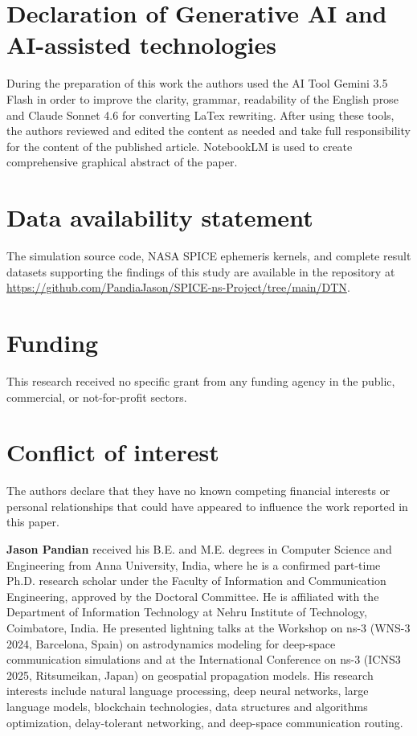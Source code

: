 \documentclass[a4paper,fleqn]{cas-dc}
\begin{document}
\section*{Declaration of Generative AI and AI-assisted technologies}
During the preparation of this work the authors used the AI Tool Gemini 3.5 Flash in order to improve the clarity, grammar, readability of the English prose and Claude Sonnet 4.6 for converting LaTex rewriting. After using these tools, the authors reviewed and edited the content as needed and take full responsibility for the content of the published article. NotebookLM is used to create comprehensive graphical abstract of the paper.

\section*{Data availability statement}
The simulation source code, NASA SPICE ephemeris kernels, and complete result datasets supporting the findings of this study are available in the repository at \url{https://github.com/PandiaJason/SPICE-ns-Project/tree/main/DTN}.

\section*{Funding}
This research received no specific grant from any funding agency in the public, commercial, or not-for-profit sectors.

\section*{Conflict of interest}
The authors declare that they have no known competing financial interests or personal relationships that could have appeared to influence the work reported in this paper.




{\bf Jason Pandian} received his B.E. and M.E. degrees in Computer Science and Engineering from Anna University, India, where he is a confirmed part-time Ph.D. research scholar under the Faculty of Information and Communication Engineering, approved by the Doctoral Committee. He is affiliated with the Department of Information Technology at Nehru Institute of Technology, Coimbatore, India. He presented lightning talks at the Workshop on ns-3 (WNS-3 2024, Barcelona, Spain) on astrodynamics modeling for deep-space communication simulations and at the International Conference on ns-3 (ICNS3 2025, Ritsumeikan, Japan) on geospatial propagation models. His research interests include natural language processing, deep neural networks, large language models, blockchain technologies, data structures and algorithms optimization, delay-tolerant networking, and deep-space communication routing. 
\endbio
\end{document}
